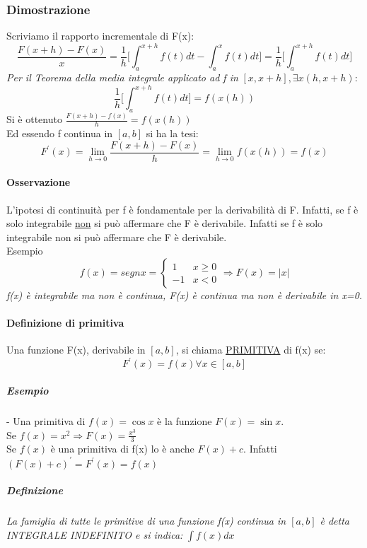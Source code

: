 \documentclass{book}
\begin{document}
\subsubsection{Dimostrazione}
Scriviamo il rapporto incrementale di F(x):
\begin{equation*}
	\frac{F(x+h)-F(x)}{x}=\frac{1}{h}\Bigg[\int^{x+h}_a f(t)dt-\int^{x}_a f(t)dt\Bigg]=\frac{1}{h}\Bigg[\int^{x+h}_a f(t)dt\Bigg]
\end{equation*}
\textit{Per il Teorema della media integrale applicato ad f in} $[x,x+h], \exists x (h,x+h)$:
\begin{equation*}
	\frac{1}{h}\Bigg[\int^{x+h}_a f(t)dt\Bigg]=f(x(h))
\end{equation*}
Si è ottenuto $\frac{F(x+h)-f(x)}{h}=f(x(h))$\\
Ed essendo f continua in $[a,b]$ si ha la tesi:
\begin{equation*}
	F^\prime (x)=\lim_{h\to0} \frac{F(x+h)-F(x)}{h}=\lim_{h\to 0} f(x(h))=f(x)
\end{equation*}
\paragraph{Osservazione}
L’ipotesi di continuità per f è fondamentale per la derivabilità di F. Infatti, se f è solo integrabile \underline{non} si può affermare che F è derivabile. Infatti se f è solo integrabile non si può affermare che F è derivabile. \\
Esempio
\begin{equation*}
	f(x)=segn x=\begin{cases}
		1 & x\geq 0\\
		-1 & x<0
	\end{cases}\Rightarrow F(x) =|x|
\end{equation*}
\textit{f(x) è integrabile ma non è continua, F(x) è continua ma non è derivabile in x=0.}
\paragraph{Definizione di primitiva}
Una funzione F(x), derivabile in $[a,b]$, si chiama \underline{PRIMITIVA} di f(x) se:
\begin{equation*}
	F^\prime(x)=f(x) \forall x\in [a,b]
\end{equation*}
\subparagraph{Esempio} - Una primitiva di $f(x)=\cos x$ è la funzione $F(x)=\sin x$.\\
Se $f(x)=x^2\Rightarrow F(x)=\frac{x^3}{3}$\\
Se $f(x)$ è una primitiva di f(x) lo è anche $F(x)+c$. Infatti $(F(x)+c)^\prime=F^\prime(x)=f(x)$\\
\subparagraph{Definizione} \textit{La famiglia di tutte le primitive di una funzione f(x) continua in $[a,b]$ è detta {\color{red} INTEGRALE INDEFINITO} e si indica: }$\int f(x)dx$
\end{document}
